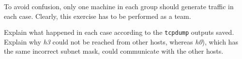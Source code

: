 \documentclass{../UTNetLab}
\begin{document}
    To avoid confusion, only one machine in each group should generate traffic in each case.
    Clearly, this exercise has to be performed as a team.
    
    \begin{report}
        \item Explain what happened in each case according to the \lstinline{tcpdump} outputs saved.
            Explain why \textit{h3} could not be reached from other hosts, whereas \textit{h0}), which has the same incorrect subnet mask, could communicate with the other hosts.
    \end{report}
\end{document}
